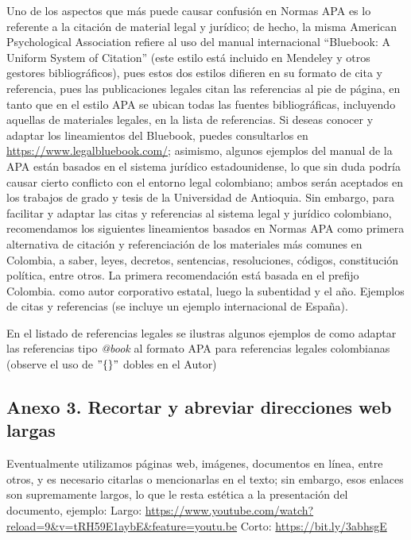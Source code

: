 Uno de los aspectos que más puede causar confusión en Normas APA es lo referente a la citación de material legal y jurídico; de hecho, la misma American Psychological Association refiere al uso del manual internacional “Bluebook: A Uniform System of Citation” (este estilo está incluido en Mendeley y otros gestores bibliográficos), pues estos dos estilos difieren en su formato de cita y referencia, pues las publicaciones legales citan las referencias al pie de página, en tanto que en el estilo APA se ubican todas las fuentes bibliográficas, incluyendo aquellas de materiales legales, en la lista de referencias. Si deseas conocer y adaptar los lineamientos del Bluebook, puedes consultarlos en \url{https://www.legalbluebook.com/}; asimismo, algunos ejemplos del manual de la APA están basados en el sistema jurídico estadounidense, lo que sin duda podría causar cierto conflicto con el entorno legal colombiano; ambos serán aceptados en los trabajos de grado y tesis de la Universidad de Antioquia. Sin embargo, para facilitar y adaptar las citas y referencias al sistema legal y jurídico colombiano, recomendamos los siguientes lineamientos basados en Normas APA como primera alternativa de citación y referenciación de los materiales más comunes en Colombia, a saber, leyes, decretos, sentencias, resoluciones, códigos, constitución política, entre otros. La primera recomendación está basada en el prefijo Colombia. como autor corporativo estatal, luego la subentidad y el año. Ejemplos de citas y referencias (se incluye un ejemplo internacional de España).

En el listado de referencias legales se ilustras algunos ejemplos de como adaptar las referencias tipo \textit{@book} al formato APA para referencias legales colombianas (observe el uso de $"\{\}"$ dobles en el Autor)

\newpage

\subsection*{Anexo 3. Recortar y abreviar direcciones web largas}

Eventualmente utilizamos páginas web, imágenes, documentos en línea, entre otros, y es necesario citarlas o mencionarlas en el texto; sin embargo, esos enlaces son supremamente largos, lo que le resta estética a la presentación del documento, ejemplo:\newline
Largo: \url{https://www.youtube.com/watch?reload=9&v=tRH59E1aybE&feature=youtu.be}\newline
Corto: \url{https://bit.ly/3abhsgE}

